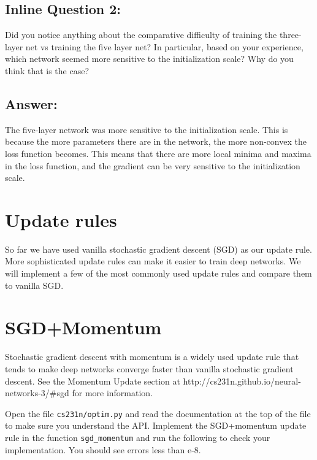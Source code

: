 \documentclass[11pt]{article}
\begin{document}
    \hypertarget{inline-question-2}{%
\subsection{Inline Question 2:}\label{inline-question-2}}

Did you notice anything about the comparative difficulty of training the
three-layer net vs training the five layer net? In particular, based on
your experience, which network seemed more sensitive to the
initialization scale? Why do you think that is the case?

\hypertarget{answer}{%
\subsection{Answer:}\label{answer}}

The five-layer network was more sensitive to the initialization scale.
This is because the more parameters there are in the network, the more
non-convex the loss function becomes. This means that there are more
local minima and maxima in the loss function, and the gradient can be
very sensitive to the initialization scale.

    \hypertarget{update-rules}{%
\section{Update rules}\label{update-rules}}

So far we have used vanilla stochastic gradient descent (SGD) as our
update rule. More sophisticated update rules can make it easier to train
deep networks. We will implement a few of the most commonly used update
rules and compare them to vanilla SGD.

    \hypertarget{sgdmomentum}{%
\section{SGD+Momentum}\label{sgdmomentum}}

Stochastic gradient descent with momentum is a widely used update rule
that tends to make deep networks converge faster than vanilla stochastic
gradient descent. See the Momentum Update section at
http://cs231n.github.io/neural-networks-3/\#sgd for more information.

Open the file \texttt{cs231n/optim.py} and read the documentation at the
top of the file to make sure you understand the API. Implement the
SGD+momentum update rule in the function \texttt{sgd\_momentum} and run
the following to check your implementation. You should see errors less
than e-8.
\end{document}
